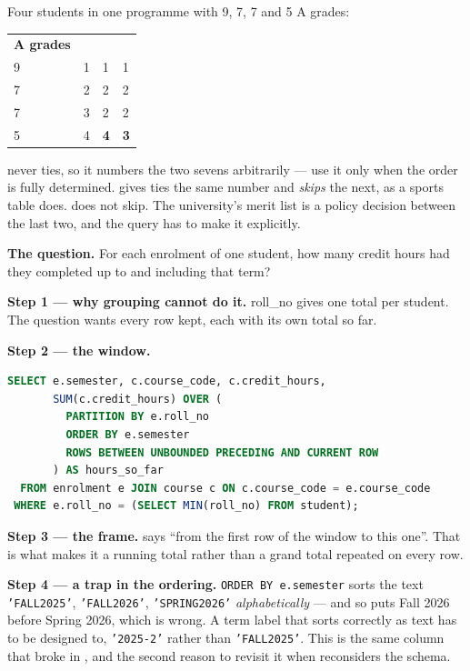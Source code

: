 \begin{examplebox}
Four students in one programme with 9, 7, 7 and 5 A grades:

\medskip
\begin{tabular}{@{}R{2.2cm}R{3.2cm}R{2.6cm}R{3.2cm}@{}}
\textbf{A grades} &  &  &  \\
9 & 1 & 1 & 1 \\
7 & 2 & 2 & 2 \\
7 & 3 & 2 & 2 \\
5 & 4 & \textbf{4} & \textbf{3} \\
\end{tabular}

\smallskip
{} never ties, so it numbers the two sevens arbitrarily ---
use it only when the order is fully determined.  gives ties the
same number and \emph{skips} the next, as a sports table does.
 does not skip. The university's merit list is a policy
decision between the last two, and the query has to make it explicitly.
\end{examplebox}

\begin{worked}
\textbf{The question.} For each enrolment of one student, how many credit hours
had they completed up to and including that term?

\medskip
\textbf{Step 1 --- why grouping cannot do it.}  roll\_no gives
one total per student. The question wants every row kept, each with its own
total so far.

\medskip
\textbf{Step 2 --- the window.}
\begin{lstlisting}[language=sql]
SELECT e.semester, c.course_code, c.credit_hours,
       SUM(c.credit_hours) OVER (
         PARTITION BY e.roll_no
         ORDER BY e.semester
         ROWS BETWEEN UNBOUNDED PRECEDING AND CURRENT ROW
       ) AS hours_so_far
  FROM enrolment e JOIN course c ON c.course_code = e.course_code
 WHERE e.roll_no = (SELECT MIN(roll_no) FROM student);
\end{lstlisting}

\medskip
\textbf{Step 3 --- the frame.}  says ``from the first row of the window to this one''. That is
what makes it a running total rather than a grand total repeated on every row.

\medskip
\textbf{Step 4 --- a trap in the ordering.} \texttt{ORDER BY e.semester} sorts
the text \texttt{'FALL2025'}, \texttt{'FALL2026'}, \texttt{'SPRING2026'}
\emph{alphabetically} --- and so puts Fall 2026 before Spring 2026, which is
wrong. A term label that sorts correctly as text has to be designed to,
\texttt{'2025-2'} rather than \texttt{'FALL2025'}. This is the same column that
broke  in , and the second reason to revisit
it when  reconsiders the schema.
\end{worked}

